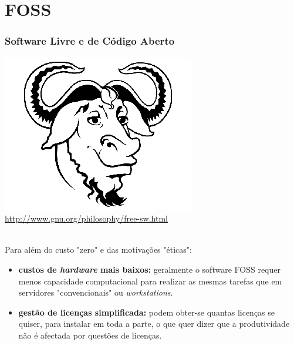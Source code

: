 \documentclass[hyperref={pdfpagelabels=true}]{beamer}
\begin{document}
\section{FOSS} 
\begin{frame}
\frametitle{Software Livre e de C\'{o}digo Aberto}
    \includegraphics[scale=0.2]{gnu.png}
    \tiny{\url{http://www.gnu.org/philosophy/free-sw.html}}\\~\\
\small{
Para al\'{e}m do custo "zero" e das motiva\c{c}\~{o}es "\'{e}ticas":
    \begin{itemize}
      \item<2-> \textbf{custos de \textit{hardware} mais baixos:} geralmente o software FOSS requer menos capacidade computacional para realizar as mesmas tarefas que em servidores "convencionais" ou \textit{workstations}.%
      \item<3-> \textbf{gest\~{a}o de licen\c{c}as simplificada:} podem obter-se quantas licen\c{c}as se quiser, para instalar em toda a parte, o que quer dizer que a produtividade n\~{a}o \'{e} afectada por quest\~{o}es de licen\c{c}as. %
      \end{itemize}
}
\end{frame}
\end{document}
